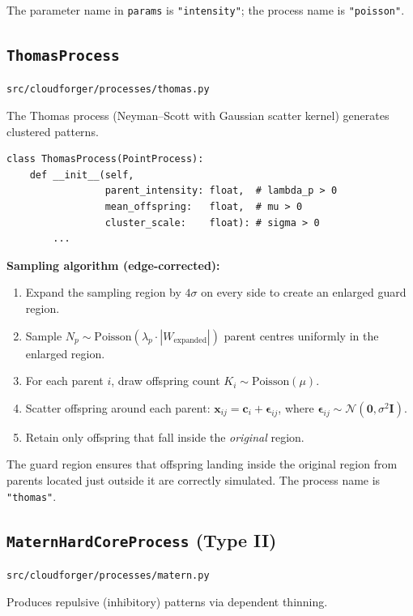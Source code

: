 \documentclass[11pt, a4paper]{article}
\newcommand{\code}[1]{\texttt{#1}}
\newcommand{\pyfile}[1]{\texttt{\small #1}}
\newcommand{\typename}[1]{\textbf{\texttt{#1}}}
\begin{document}
The parameter name in \code{params} is \code{"intensity"};
the process name is \code{"poisson"}.

\subsection{\typename{ThomasProcess}}
\pyfile{src/cloudforger/processes/thomas.py}

The Thomas process (Neyman--Scott with Gaussian scatter kernel)
generates clustered patterns.

\begin{lstlisting}
class ThomasProcess(PointProcess):
    def __init__(self,
                 parent_intensity: float,  # lambda_p > 0
                 mean_offspring:   float,  # mu > 0
                 cluster_scale:    float): # sigma > 0
        ...
\end{lstlisting}

\textbf{Sampling algorithm (edge-corrected):}
\begin{enumerate}
  \item Expand the sampling region by $4\sigma$ on every side to create
        an enlarged guard region.
  \item Sample $N_p \sim \mathrm{Poisson}(\lambda_p \cdot |W_{\mathrm{expanded}}|)$
        parent centres uniformly in the enlarged region.
  \item For each parent $i$, draw offspring count
        $K_i \sim \mathrm{Poisson}(\mu)$.
  \item Scatter offspring around each parent:
        $\mathbf{x}_{ij} = \mathbf{c}_i + \boldsymbol{\epsilon}_{ij}$,
        where $\boldsymbol{\epsilon}_{ij} \sim \mathcal{N}(\mathbf{0},
        \sigma^2 \mathbf{I})$.
  \item Retain only offspring that fall inside the \emph{original} region.
\end{enumerate}

The guard region ensures that offspring landing inside the original
region from parents located just outside it are correctly simulated.
The process name is \code{"thomas"}.

\subsection{\typename{MaternHardCoreProcess} (Type II)}
\pyfile{src/cloudforger/processes/matern.py}

Produces repulsive (inhibitory) patterns via dependent thinning.
\end{document}
